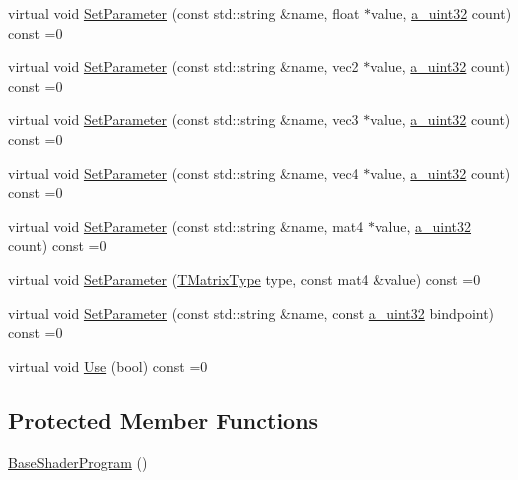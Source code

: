 \begin{DoxyCompactItemize}
virtual void \hyperlink{class_agmd_1_1_base_shader_program_a71c97a8b14f618870399180e6854d41a}{Set\+Parameter} (const std\+::string \&name, float $\ast$value, \hyperlink{_common_defines_8h_a964296f9770051b9e4807b1f180dd416}{a\+\_\+uint32} count) const =0
\item 
virtual void \hyperlink{class_agmd_1_1_base_shader_program_a1236f2416f16faf3f1bbd498ae8f6130}{Set\+Parameter} (const std\+::string \&name, vec2 $\ast$value, \hyperlink{_common_defines_8h_a964296f9770051b9e4807b1f180dd416}{a\+\_\+uint32} count) const =0
\item 
virtual void \hyperlink{class_agmd_1_1_base_shader_program_a38bbbad0376d30d766206b3993af20d6}{Set\+Parameter} (const std\+::string \&name, vec3 $\ast$value, \hyperlink{_common_defines_8h_a964296f9770051b9e4807b1f180dd416}{a\+\_\+uint32} count) const =0
\item 
virtual void \hyperlink{class_agmd_1_1_base_shader_program_a61ba0324f392e6e615d24bd5754edc1f}{Set\+Parameter} (const std\+::string \&name, vec4 $\ast$value, \hyperlink{_common_defines_8h_a964296f9770051b9e4807b1f180dd416}{a\+\_\+uint32} count) const =0
\item 
virtual void \hyperlink{class_agmd_1_1_base_shader_program_a58f818f4f1c30d64eedfbf270c45ae22}{Set\+Parameter} (const std\+::string \&name, mat4 $\ast$value, \hyperlink{_common_defines_8h_a964296f9770051b9e4807b1f180dd416}{a\+\_\+uint32} count) const =0
\item 
virtual void \hyperlink{class_agmd_1_1_base_shader_program_a8dc439338afc188fb799c148c5a80f6d}{Set\+Parameter} (\hyperlink{namespace_agmd_aa7eba958a8a0e3ac4586f75298e122b1}{T\+Matrix\+Type} type, const mat4 \&value) const =0
\item 
virtual void \hyperlink{class_agmd_1_1_base_shader_program_a8fce978e7f8d453e2d3fe3333da0e425}{Set\+Parameter} (const std\+::string \&name, const \hyperlink{_common_defines_8h_a964296f9770051b9e4807b1f180dd416}{a\+\_\+uint32} bindpoint) const =0
\item 
virtual void \hyperlink{class_agmd_1_1_base_shader_program_a012143de4494c70afabb7a0eca867cd9}{Use} (bool) const =0
\end{DoxyCompactItemize}
\subsection*{Protected Member Functions}
\begin{DoxyCompactItemize}
\item 
\hyperlink{class_agmd_1_1_base_shader_program_a869e63682c9820d582ffccecbac785e6}{Base\+Shader\+Program} ()
\end{DoxyCompactItemize}
